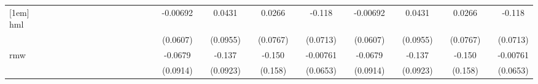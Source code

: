\begin{table}[htbp]
\begin{tabular}{l*{28}{c}}
[1em]
hml                 &                     &                     &                     &                     &                     &                     &                     &                     &                     &                     &                     &                     &                     &    -0.00692         &                     &      0.0431         &                     &      0.0266         &                     &      -0.118         &                     &    -0.00692         &                     &      0.0431         &                     &      0.0266         &                     &      -0.118         \\
                    &                     &                     &                     &                     &                     &                     &                     &                     &                     &                     &                     &                     &                     &    (0.0607)         &                     &    (0.0955)         &                     &    (0.0767)         &                     &    (0.0713)         &                     &    (0.0607)         &                     &    (0.0955)         &                     &    (0.0767)         &                     &    (0.0713)         \\
[1em]
rmw                 &                     &                     &                     &                     &                     &                     &                     &                     &                     &                     &                     &                     &                     &     -0.0679         &                     &      -0.137         &                     &      -0.150         &                     &    -0.00761         &                     &     -0.0679         &                     &      -0.137         &                     &      -0.150         &                     &    -0.00761         \\
                    &                     &                     &                     &                     &                     &                     &                     &                     &                     &                     &                     &                     &                     &    (0.0914)         &                     &    (0.0923)         &                     &     (0.158)         &                     &    (0.0653)         &                     &    (0.0914)         &                     &    (0.0923)         &                     &     (0.158)         &                     &    (0.0653)         \\

\end{tabular}
\end{table}
